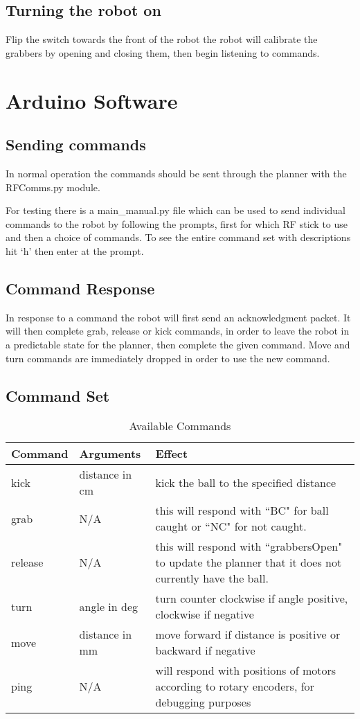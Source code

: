 \subsection{Turning the robot on}
Flip the switch towards the front of the robot the robot will calibrate the grabbers by opening and closing them, then begin listening to commands.

\section{Arduino Software}
\subsection{Sending commands}
In normal operation the commands should be sent through the planner with the RFComms.py module. 

For testing there is a main\_manual.py file which can be used to send individual commands to the robot by following the 
prompts, first for which RF stick to use and then a choice of commands. To see the entire command set  with descriptions hit `h' then enter at the prompt. 


\subsection{Command Response}
In response to a command the robot will first send an acknowledgment packet. It will then complete grab, release or kick commands, in order to leave the robot in a predictable state for the planner, then complete the given command. Move and turn commands are immediately dropped in order to use the new command. 

\subsection{Command Set}
\begin{table}[H]
\begin{tabularx}{\textwidth}{ llX }
\toprule
\textbf{Command} & \textbf{Arguments} & \textbf{Effect} \\
\midrule
kick & distance in cm & kick the ball to the specified distance\\
grab & N/A & this will respond with ``BC" for ball caught or ``NC" for not caught. \\
release & N/A & this will respond with ``grabbersOpen" to update the planner that it does not currently have the ball. \\
turn & angle in deg & turn counter clockwise if angle positive, clockwise if negative\\
move & distance in mm & move forward if distance is positive or backward if negative \\
ping & N/A &  will respond with positions of motors according to rotary encoders, for debugging purposes \\
\bottomrule
\end{tabularx}
\caption{Available Commands}
\end{table}


